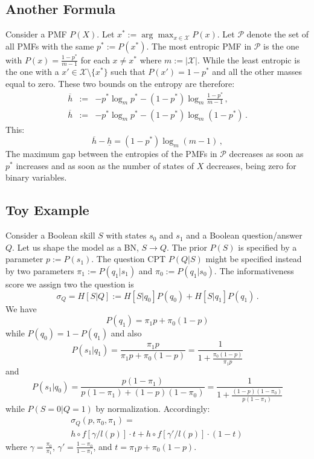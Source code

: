 \documentclass[runningheads]{llncs}
\begin{document}
	\subsection*{Another Formula}
	Consider a PMF $P(X)$. Let $x^*:=\arg\max_{x\in\mathcal{X}} P(x)$. Let $\mathcal{P}$ 
	denote the set of all PMFs with the same $p^*:=P(x^*)$. The most entropic PMF in 
	$\mathcal{P}$ is the one with  $P(x)=\frac{1-p^*}{m-1}$ for each $x\neq x^*$ where 
	$m:=|\mathcal{X}|$. While the least entropic is the one with a 
	$x'\in\mathcal{X}\setminus\{x^*\}$ such that $P(x')=1-p^*$ and all the other masses 
	equal to zero. These two bounds on the entropy are therefore:
	\begin{eqnarray}
		\overline{h}&:=& -p^* \log_m p^* - (1-p^*) \log_m \frac{1-p^*}{m-1}\,,\\
		\overline{h}&:=& -p^* \log_m p^* - (1-p^*) \log_m (1-p^*)\,.
	\end{eqnarray}
	This:
	\begin{equation}
		\overline{h}-\underline{h}=(1-p^*) \log_m (m-1)\,,
	\end{equation}
	The maximum gap between the entropies of the PMFs in $\mathcal{P}$ decreases as 
	soon as $p^*$ increases and as soon as the number of states of $X$ decreases, being 
	zero for binary variables.
	
	\subsection*{Toy Example}
	Consider a Boolean skill $S$ with states $s_0$ and $s_1$ and a Boolean 
	question/answer $Q$. Let us shape the model as a BN, $S\to Q$. The prior $P(S)$ is 
	specified by a parameter $p:=P(s_1)$. The question CPT $P(Q|S)$ might be specified 
	instead by two parameters $\pi_1:=P(q_1|s_1)$ and $\pi_0:=P(q_1|s_0)$. The 
	informativeness score we assign two the question is
	\begin{equation}
		\sigma_Q = H[S|Q]:=H[S|q_0]P(q_0)+H[S|q_1]P(q_1)\,.
	\end{equation}
	We have
	\begin{equation}
		P(q_1)=\pi_1 p + \pi_0 (1-p)
	\end{equation}
	while $P(q_0)=1-P(q_1)$ and also
	\begin{equation}
		P(s_1|q_1)=\frac{\pi_1 p}{\pi_1 p + \pi_0 (1-p)}=\frac{1}{1+\frac{\pi_0(1-p)}{\pi_1 p}}
	\end{equation}
	and
	\begin{equation}
		P(s_1|q_0)=\frac{p (1-\pi_1)}{p(1-\pi_1) +  (1-p)(1-\pi_0)} = \frac{1}{1+ \frac{ 
		(1-p)(1-\pi_0)}{p (1-\pi_1)}} 
	\end{equation}
	while $P(S=0|Q=1)$ by normalization. Accordingly:
	\begin{multline}
		\sigma_Q(p,\pi_0,\pi_1)=\\
		h \circ f[\gamma/l(p)] \cdot t +
		h \circ f[\gamma'/l(p)] \cdot (1-t)\,
	\end{multline}
	where $\gamma = \frac{\pi_0}{\pi_1}$, $\gamma' = \frac{1-\pi_0}{1-\pi_1}$, and $t = \pi_1 
	p + \pi_0 (1-p)$.
	
\end{document}
